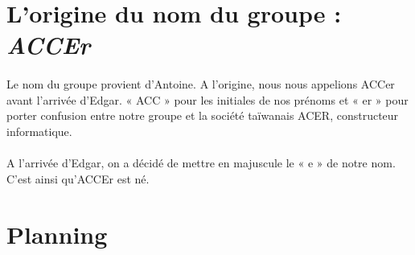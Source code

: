 \documentclass[titlepage, 13px, a4paper]{report}
\begin{document}
\section{L'origine du nom du groupe : \textit{ACCEr}}
\paragraph{} \hspace{0pt}
Le nom du groupe provient d’Antoine. A l’origine, nous nous appelions ACCer avant l’arrivée d’Edgar. 
« ACC » pour les initiales de nos prénoms et « er » pour porter confusion entre notre groupe 
et la société taïwanais ACER, constructeur informatique. \\ \\
A l’arrivée d’Edgar, on a décidé de mettre en majuscule le « e » de notre nom. \\
C’est ainsi qu’ACCEr est né.

\newpage

\section{Planning}
\end{document}
